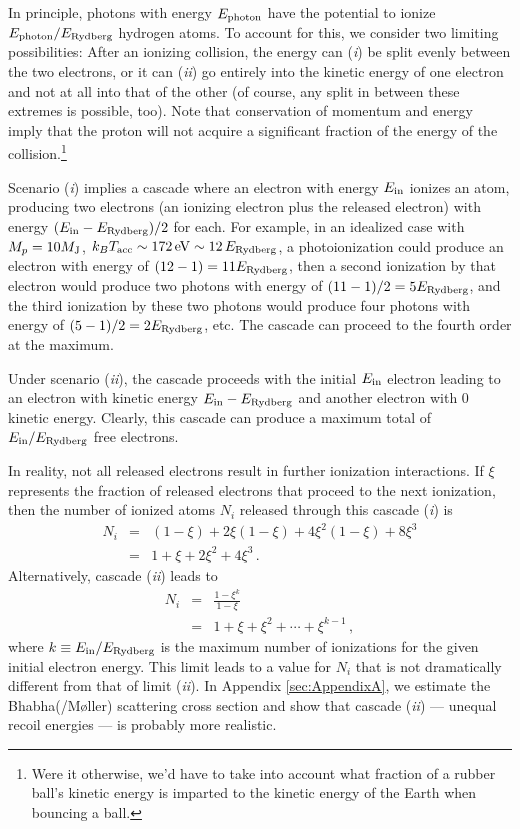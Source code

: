\documentclass[iop,numberedappendix,apj,twocolappendix,]{emulateapj}
\begin{document}
In principle, photons with energy $E_{\rm photon}$ have the potential to ionize $E_{\rm photon}/E_{\rm Rydberg}$ hydrogen atoms.
To account for this, we consider two limiting possibilities:
After an ionizing collision, the energy can (\emph{i}) be split evenly between the two electrons, or it can (\emph{ii}) go entirely into the kinetic energy of one electron and not at all into that of the other (of course, any split in between these extremes is possible, too).
Note that conservation of momentum and energy imply that the proton will not acquire a significant fraction of the energy of the collision.\footnote{Were it otherwise, we'd have to take into account what fraction of a rubber ball's kinetic energy is imparted to the kinetic energy of the Earth when bouncing a ball.}  

Scenario (\emph{i}) implies a cascade where an electron with energy $E_{\rm in}$ ionizes an atom, producing two electrons (an ionizing electron plus the released electron) with energy $ ( E_{\rm in} - E_{\rm Rydberg} ) /2 $ for each.
For example, in an idealized case with $M_p = 10 M_{\rm J}$, $k_B T_{\rm acc} \sim 172\,{\rm eV} \sim 12 \, E_{\rm Rydberg}$, a photoionization could produce an electron with energy of $(12-1) = 11 E_{\rm Rydberg} $, then a second ionization by that electron would produce two photons with energy of $(11-1)/2 = 5 E_{\rm Rydberg}$, and the third ionization by these two photons would produce four photons with energy of $(5-1)/2 = 2 E_{\rm Rydberg}$, etc.
The cascade can proceed to the fourth order at the maximum.

Under scenario (\emph{ii}), the cascade proceeds with the initial $E_{\rm in}$ electron leading to an electron with kinetic energy $E_{\rm in} - E_{\rm Rydberg}$ and another electron with 0 kinetic energy.
Clearly, this cascade can produce a maximum total of $E_{\rm in} / E_{\rm Rydberg}$ free electrons.

In reality, not all released electrons result in further ionization interactions.
If $\xi$ represents the fraction of released electrons that proceed to the next ionization, then the number of ionized atoms $N_i$ released through this cascade (\emph{i}) is
\begin{eqnarray}
  \nonumber N_i & = & (1-\xi) + 2\xi (1-\xi) + 4 \xi^2 (1-\xi) + 8 \xi^3 \\
  \label{eq:N_i1} & = & 1 + \xi + 2 \xi^2 + 4 \xi ^3 \, .
\end{eqnarray}
Alternatively, cascade (\emph{ii}) leads to
\begin{eqnarray}
  \nonumber N_i & = & \frac{1 - \xi^k}{1 - \xi} \\
  \label{eq:N_i2}  & = & 1 + \xi + \xi^2 + \cdots + \xi^{k - 1} \, ,
\end{eqnarray}
where $k \equiv E_{\rm in} / E_{\rm Rydberg}$ is the maximum number of ionizations for the given initial electron energy.
This limit leads to a value for $N_i$ that is not dramatically different from that of limit (\emph{ii}).
In Appendix \ref{sec:AppendixA}, we estimate the Bhabha(/M{\o}ller) scattering cross section and show that cascade (\emph{ii}) --- unequal recoil energies --- is probably more realistic.
\end{document}
